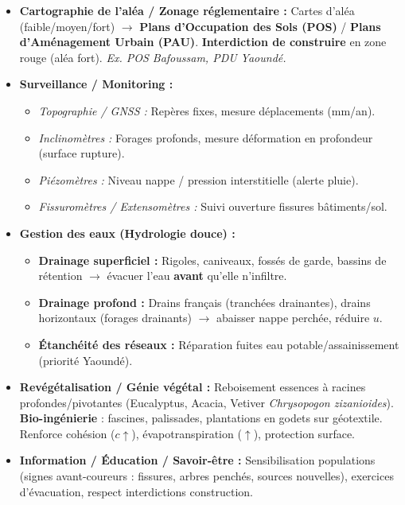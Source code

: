 \documentclass[11pt]{article}
\begin{document}
\begin{propriete}
\begin{itemize}
    \item \textbf{Cartographie de l'aléa / Zonage réglementaire :} Cartes d'aléa (faible/moyen/fort) $\rightarrow$ \textbf{Plans d'Occupation des Sols (POS)} / \textbf{Plans d'Aménagement Urbain (PAU)}. \textbf{Interdiction de construire} en zone rouge (aléa fort). \textit{Ex. POS Bafoussam, PDU Yaoundé.}
    \item \textbf{Surveillance / Monitoring :} 
    \begin{itemize}
        \item \textit{Topographie / GNSS :} Repères fixes, mesure déplacements (mm/an).
        \item \textit{Inclinomètres :} Forages profonds, mesure déformation en profondeur (surface rupture).
        \item \textit{Piézomètres :} Niveau nappe / pression interstitielle (alerte pluie).
        \item \textit{Fissuromètres / Extensomètres :} Suivi ouverture fissures bâtiments/sol.
    \end{itemize}
    \item \textbf{Gestion des eaux (Hydrologie douce) :}
    \begin{itemize}
        \item \textbf{Drainage superficiel :} Rigoles, caniveaux, fossés de garde, bassins de rétention $\rightarrow$ évacuer l'eau \textbf{avant} qu'elle n'infiltre.
        \item \textbf{Drainage profond :} Drains français (tranchées drainantes), drains horizontaux (forages drainants) $\rightarrow$ abaisser nappe perchée, réduire $u$.
        \item \textbf{Étanchéité des réseaux :} Réparation fuites eau potable/assainissement (priorité Yaoundé).
    \end{itemize}
    \item \textbf{Revégétalisation / Génie végétal :} Reboisement essences à racines profondes/pivotantes (Eucalyptus, Acacia, Vetiver \textit{Chrysopogon zizanioides}). \textbf{Bio-ingénierie} : fascines, palissades, plantations en godets sur géotextile. Renforce cohésion ($c \uparrow$), évapotranspiration ($\uparrow$), protection surface.
    \item \textbf{Information / Éducation / Savoir-être :} Sensibilisation populations (signes avant-coureurs : fissures, arbres penchés, sources nouvelles), exercices d'évacuation, respect interdictions construction.
\end{itemize}
\end{propriete}
\end{document}
